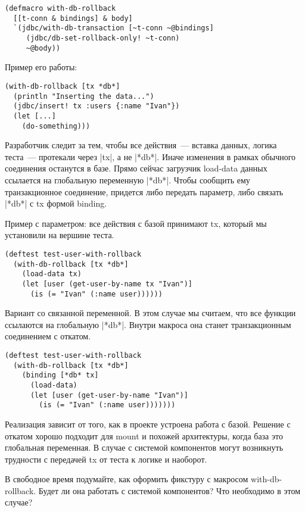 \begin{verbatim}
(defmacro with-db-rollback
  [[t-conn & bindings] & body]
  `(jdbc/with-db-transaction [~t-conn ~@bindings]
     (jdbc/db-set-rollback-only! ~t-conn)
     ~@body))
\end{verbatim}

Пример его работы:

\begin{verbatim}
(with-db-rollback [tx *db*]
  (println "Inserting the data...")
  (jdbc/insert! tx :users {:name "Ivan"})
  (let [...]
    (do-something)))
\end{verbatim}

Разработчик следит за тем, чтобы все действия~--- вставка данных, логика теста~---
протекали через \spverb|tx|, а не \spverb|*db*|. Иначе изменения в рамках обычного соединения
останутся в базе. Прямо сейчас загрузчик load-data данных ссылается на
глобальную переменную \spverb|*db*|. Чтобы сообщить ему транзакционное соединение,
придется либо передать параметр, либо связать \spverb|*db*| с tx формой binding.

Пример с параметром: все действия с базой принимают tx, который мы установили на
вершине теста.

\begin{verbatim}
(deftest test-user-with-rollback
  (with-db-rollback [tx *db*]
    (load-data tx)
    (let [user (get-user-by-name tx "Ivan")]
      (is (= "Ivan" (:name user))))))
\end{verbatim}

Вариант со связанной переменной. В этом случае мы считаем, что все функции
ссылаются на глобальную \spverb|*db*|. Внутри макроса она станет транзакционным
соединением с откатом.

\begin{verbatim}
(deftest test-user-with-rollback
  (with-db-rollback [tx *db*]
    (binding [*db* tx]
      (load-data)
      (let [user (get-user-by-name "Ivan")]
        (is (= "Ivan" (:name user)))))))
\end{verbatim}

Реализация зависит от того, как в проекте устроена работа с базой. Решение с
откатом хорошо подходит для mount и похожей архитектуры, когда база это
глобальная переменная. В случае с системой компонентов могут возникнуть
трудности с передачей tx от теста к логике и наоборот.

В свободное время подумайте, как оформить фикстуру с макросом
with-db-rollback. Будет ли она работать с системой компонентов? Что необходимо в
этом случае?


